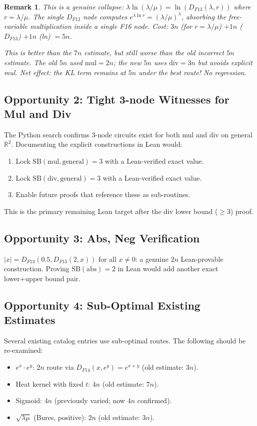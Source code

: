 \documentclass[11pt]{article}
\newtheorem{remark}[theorem]{Remark}
\newcommand{\ok}[1]{\textcolor{ok}{#1}}
\begin{document}
\begin{remark}
This is a genuine collapse: $\lambda\ln(\lambda/\mu) = \ln(D_{F13}(\lambda, r))$ where $r = \lambda/\mu$.
The single $D_{F13}$ node computes $e^{\lambda\ln r} = (\lambda/\mu)^\lambda$, absorbing the
free-variable multiplication inside a single F16 node. Cost: $3n$ (for $r = \lambda/\mu$) $+ 1n$ ($D_{F13}$) $+ 1n$ (ln) $= 5n$.

This is better than the $7n$ estimate, but still worse than the old incorrect $5n$ estimate.
The old $5n$ used $\mathrm{mul} = 2n$; the new $5n$ uses $\mathrm{div} = 3n$ but avoids explicit mul.
\emph{Net effect}: the KL term remains at $5n$ under the best route! \ok{No regression.}
\end{remark}

\subsection{Opportunity 2: Tight 3-node Witnesses for Mul and Div}

The Python search confirms 3-node circuits exist for both mul and div on general $\mathbb{R}^2$.
Documenting the explicit constructions in Lean would:
\begin{enumerate}
  \item Lock $\mathrm{SB}(\mathrm{mul},\mathrm{general}) = 3$ with a Lean-verified exact value.
  \item Lock $\mathrm{SB}(\mathrm{div},\mathrm{general}) = 3$ with a Lean-verified exact value.
  \item Enable future proofs that reference these as sub-routines.
\end{enumerate}
This is the primary remaining Lean target after the div lower bound ($\geq 3$) proof.

\subsection{Opportunity 3: Abs, Neg Verification}

$|x| = D_{F13}(0.5, D_{F13}(2,x))$ for all $x \neq 0$: a genuine $2n$ Lean-provable construction.
Proving $\mathrm{SB}(\mathrm{abs}) = 2$ in Lean would add another exact lower+upper bound pair.

\subsection{Opportunity 4: Sub-Optimal Existing Estimates}

Several existing catalog entries use sub-optimal routes. The following should be re-examined:
\begin{itemize}
  \item $e^x \cdot e^y$: $2n$ route via $D_{F14}(x, e^y) = e^{x+y}$ (old estimate: $3n$).
  \item Heat kernel with fixed $t$: $4n$ (old estimate: $7n$).
  \item Sigmoid: $4n$ (previously varied; now $4n$ confirmed).
  \item $\sqrt{\lambda\mu}$ (Bures, positive): $2n$ (old estimate: $3n$).
\end{itemize}
\end{document}
